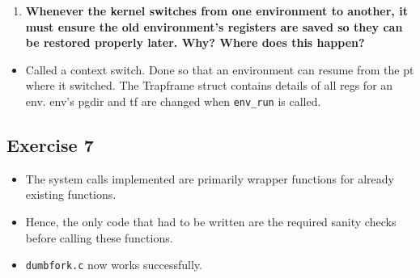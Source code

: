 \documentclass[]{article}
\begin{document}
\begin{enumerate}
\def\labelenumi{\arabic{enumi}.}
\setcounter{enumi}{3}
\itemsep1pt\parskip0pt
\item
  \textbf{Whenever the kernel switches from one environment to another,
  it must ensure the old environment's registers are saved so they can
  be restored properly later. Why? Where does this happen?}
\end{enumerate}

\begin{itemize}
\itemsep1pt\parskip0pt
\item
  Called a context switch. Done so that an environment can resume from
  the pt where it switched. The Trapframe struct contains details of all
  regs for an env. env's pgdir and tf are changed when \texttt{env\_run}
  is called.
\end{itemize}

\subsection{Exercise 7}

\begin{itemize}
\itemsep1pt\parskip0pt
\item
  The system calls implemented are primarily wrapper functions for
  already existing functions.
\item
  Hence, the only code that had to be written are the required sanity
  checks before calling these functions.
\item
  \texttt{dumbfork.c} now works successfully.
\end{itemize}
\end{document}
